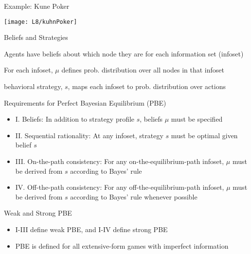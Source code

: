 \documentclass[11pt,aspectratio=169]{beamer}
\begin{document}
  
  \begin{frame}{Example: Kune Poker}
   \begin{center}
    \texttt{[image: L8/kuhnPoker]}
   \end{center}
  \end{frame}
    
  
  \begin{frame}{Beliefs and Strategies}
   \begin{itemizes}[1.5em]
    \item Agents have \alert{beliefs} about which node they are for each information set (\alert{infoset})
    \item For each infoset, $\mu$ defines \alert{prob. distribution} over all nodes in that infoset
    \item \alert{behavioral strategy}, $s$, maps each infoset to prob. distribution over actions
   \end{itemizes}
  \end{frame}
  
  
  \begin{frame}{Requirements for Perfect Bayesian Equilibrium (PBE)}
   \begin{itemize}[<+->]
   \setlength{\itemsep}{1em}
    \item I. Beliefs: In addition to strategy profile $s$, beliefs $\mu$ must be specified
    \item II. \alert{Sequential rationality}: At any infoset, strategy $s$ must be optimal given belief $s$
    \item III. \alert{On-the-path consistency}: For any on-the-equilibrium-path infoset, $\mu$ must be derived from $s$ according to \alert{Bayes' rule}
    \item IV. \alert{Off-the-path consistency}: For any off-the-equilibrium-path infoset, $\mu$ must be derived from $s$ according to Bayes' rule \alert{whenever possible}
   \end{itemize}     
  \end{frame}

  
  \begin{frame}{Weak and Strong PBE}
   \begin{itemize}
   \setlength{\itemsep}{2em}
    \item I-III define \alert{weak PBE}, and I-IV define {strong PBE}
    \item PBE is defined for all extensive-form games with imperfect information
   \end{itemize}
  \end{frame}
  
\end{document}

